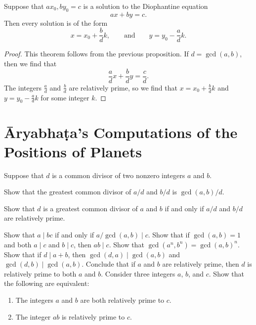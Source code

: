 \begin{theorem}\label{theorem:set-of-solutions-binary-linear-diophantine-equation}
  Suppose that $ax_0,by_0=c$ is a solution to the Diophantine equation
  \begin{equation*}
    ax + by = c.
  \end{equation*}
  Then every solution is of the form
  \begin{equation*}
    x = x_0 + \frac{b}{d}k,\qquad\text{and}\qquad y = y_0-\frac{a}{d}k.
  \end{equation*}
\end{theorem}

\begin{proof}
  This theorem follows from the previous proposition. If $d=\gcd(a,b)$, then we find that
  \begin{equation*}
    \frac{a}{d}x+\frac{b}{d}y=\frac{c}{d}.
  \end{equation*}
  The integers $\frac{a}{d}$ and $\frac{b}{d}$ are relatively prime, so we find that $x=x_0+\frac{b}{d}k$ and $y=y_0-\frac{a}{d}k$ for some integer $k$.
\end{proof}

\section{Āryabhaṭa's Computations of the Positions of Planets}


\exercises

\begin{starter}
  \exercise Suppose that $d$ is a common divisor of two nonzero integers $a$ and $b$.
  \begin{subexenum}
  \item Show that the greatest common divisor of $a/d$ and $b/d$ is $\gcd(a,b)/d$.
  \item Show that $d$ is a greatest common divisor of $a$ and $b$ if and only if $a/d$ and $b/d$ are relatively prime.  
  \end{subexenum}
  \exercise Show that $a\mid bc$ if and only if $a/\gcd(a,b) \mid c$.
  \exercise Show that if $\gcd(a,b)=1$ and both $a\mid c$ and $b\mid c$, then $ab\mid c$.  
  \exercise Show that $\gcd(a^n,b^n)=\gcd(a,b)^n$.
  \exercise Show that if $d\mid a + b$, then $\gcd(d,a)\mid \gcd(a,b)$ and $\gcd(d,b)\mid\gcd(a,b)$. Conclude that if $a$ and $b$ are relatively prime, then $d$ is relatively prime to both $a$ and $b$.
  \exercise Consider three integers $a$, $b$, and $c$. Show that the following are equivalent:
  \begin{enumerate}
  \item The integers $a$ and $b$ are both relatively prime to $c$.
  \item The integer $ab$ is relatively prime to $c$.
  \end{enumerate}
\end{starter}

